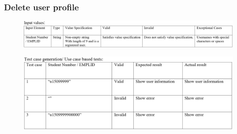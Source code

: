 \documentclass[english]{article}
\begin{document}
\subsubsection{Delete user profile}
\begin{figure}[ht!]
\hspace*{-2.5cm}
\includegraphics[width=180mm]{12.png}
\end{figure}
\begin{figure}[ht!]
\hspace*{-2.5cm}
\includegraphics[width=180mm]{ViewTestCase.png}
\end{figure}
\clearpage
\end{document}
